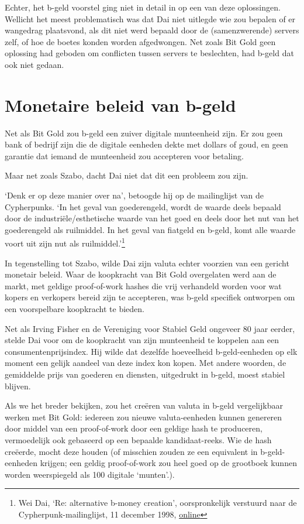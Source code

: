 \documentclass[smalldemyvopaper,11pt,twoside,onecolumn,openright,extrafontsizes,hidelinks]{memoir}
\begin{document}
Echter, het b-geld voorstel ging niet in detail in op een van deze
oplossingen. Wellicht het meest problematisch was dat Dai niet uitlegde
wie zou bepalen of er wangedrag plaatsvond, als dit niet werd bepaald
door de (samenzwerende) servers zelf, of hoe de boetes konden worden
afgedwongen. Net zoals Bit Gold geen oplossing had geboden om conflicten
tussen servers te beslechten, had b-geld dat ook niet gedaan.

\section{Monetaire beleid van b-geld}\label{monetaire-beleid-van-b-geld}

Net als Bit Gold zou b-geld een zuiver digitale munteenheid zijn. Er zou
geen bank of bedrijf zijn die de digitale eenheden dekte met dollars of
goud, en geen garantie dat iemand de munteenheid zou accepteren voor
betaling.

Maar net zoals Szabo, dacht Dai niet dat dit een probleem zou zijn.

`Denk er op deze manier over na', betoogde hij op de mailinglijst van de
Cypherpunks. `In het geval van goederengeld, wordt de waarde deels
bepaald door de industriële/esthetische waarde van het goed en deels
door het nut van het goederengeld als ruilmiddel. In het geval van
fiatgeld en b-geld, komt alle waarde voort uit zijn nut als
ruilmiddel.'\footnote{Wei Dai, `Re: alternative b-money creation',
  oorspronkelijk verstuurd naar de Cypherpunk-mailinglijst, 11 december
  1998,
  \href{https://cypherpunks.venona.com/date/1998/12/msg00448.html}{online}}

In tegenstelling tot Szabo, wilde Dai zijn valuta echter voorzien van
een gericht monetair beleid. Waar de koopkracht van Bit Gold overgelaten
werd aan de markt, met geldige proof-of-work hashes die vrij verhandeld
worden voor wat kopers en verkopers bereid zijn te accepteren, was
b-geld specifiek ontworpen om een voorspelbare koopkracht te bieden.

Net als Irving Fisher en de Vereniging voor Stabiel Geld ongeveer 80
jaar eerder, stelde Dai voor om de koopkracht van zijn munteenheid te
koppelen aan een consumentenprijsindex. Hij wilde dat dezelfde
hoeveelheid b-geld-eenheden op elk moment een gelijk aandeel van deze
index kon kopen. Met andere woorden, de gemiddelde prijs van goederen en
diensten, uitgedrukt in b-geld, moest stabiel blijven.

Als we het breder bekijken, zou het creëren van valuta in b-geld
vergelijkbaar werken met Bit Gold: iedereen zou nieuwe valuta-eenheden
kunnen genereren door middel van een proof-of-work door een geldige hash
te produceren, vermoedelijk ook gebaseerd op een bepaalde
kandidaat-reeks. Wie de hash creëerde, mocht deze houden (of misschien
zouden ze een equivalent in b-geld-eenheden krijgen; een geldig
proof-of-work zou heel goed op de grootboek kunnen worden weerspiegeld
als 100 digitale `munten'.).
\end{document}
